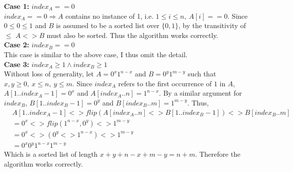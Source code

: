 \documentclass[12pt]{article}
\newenvironment{lemma}[2][Lemma]{\begin{trivlist}
\item[\hskip \labelsep {\bfseries #1}\hskip \labelsep {\bfseries #2.}]}{\end{trivlist}}
\newenvironment{question}[2][Question]{\begin{trivlist}
\item[\hskip \labelsep {\bfseries #1}\hskip \labelsep {\bfseries #2.}]}{\end{trivlist}}
\begin{document}
\begin{question}{1 (a)}
\begin{lemma}{1.1}
    \textbf{Case 1:} $index_{A} == 0$\\
    $index_{A} == 0 \Rightarrow A$ contains no instance of 1, i.e.
    $ 1 \leq i \leq n,\ A[i] == 0$.  Since $0 \leq 0 \leq 1$ and $B$ is assumed
    to be a sorted list over $\{0, 1\}$, by the transitivity of $\leq$ $A <> B$
    must also be sorted. Thus the algorithm works correctly.\\

    \textbf{Case 2:} $index_{B} == 0$\\
    This case is similar to the above case, I thus omit the detail. \\

    \textbf{Case 3:} $index_{A} \geq 1 \land index_{B} \geq 1$\\
    Without loss of generality, let $A = 0^{x}1^{n-x}$ and
    $B = 0^{y}1^{m-y}$ such that $x, y \geq 0,\ x \leq n,\ y \leq m$.
    Since $index_{A}$ refers to the first occurrence of $1$ in $A$,
    $A[1..index_{A} - 1] = 0^{x}$ and $A[index_{A}..n] = 1^{n-x}$.  By a similar
    argument for $index_{B}$, $B[1..index_{B} - 1] = 0^{y}$ and $B[index_{B}..m] = 1^{m-y}$.
    Thus,
    \begin{align*}
      & A[1..index_{A} - 1] <> flip(A[index_{A}..n] <> B[1..index_{B} - 1]) <> B[index_{B}..m] &\\
      & = 0^{x} <> flip(1^{n-x}, 0^{y}) <> 1^{m-y} & \\
      & = 0^{x} <> (0^{y} <> 1^{n-x}) <> 1^{m-y} & \\
      & = 0^{x}0^{y}1^{n-x}1^{m-y} &
    \end{align*}
    Which is a sorted list of length $x + y + n - x + m - y = n + m$.
    Therefore the algorithm works correctly.
  \end{lemma}


\end{question}
\end{document}
